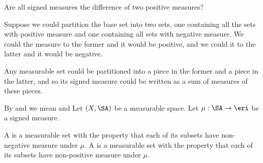 
\sbasic



































\sstart
{}


Are all signed measures
the difference of two
positive measures?

Suppose we could partition
the base set into two
sets, one containing
all the sets with positive
measure and one containing
all sets with negative measure.
We could
 the measure to
the former and it would
be positive, and we could
 it to the latter
and it would be negative.

Any measurable set could be partitioned
into a piece in the former and a
piece in the latter, and so
its signed measure could be
written as a sum of measures
of these pieces.


By  and
we mean 
and 
Let $(X, \SA)$ be
a measurable space.
Let $\mu: \SA \to \eri$
be a signed measure.

A 
is a measurable set
with the property that
each of its subsets have
non-negative measure
under $\mu$.
A 
is a measurable set
with the property that
each of its subsets have
non-positive measure
under $\mu$.

